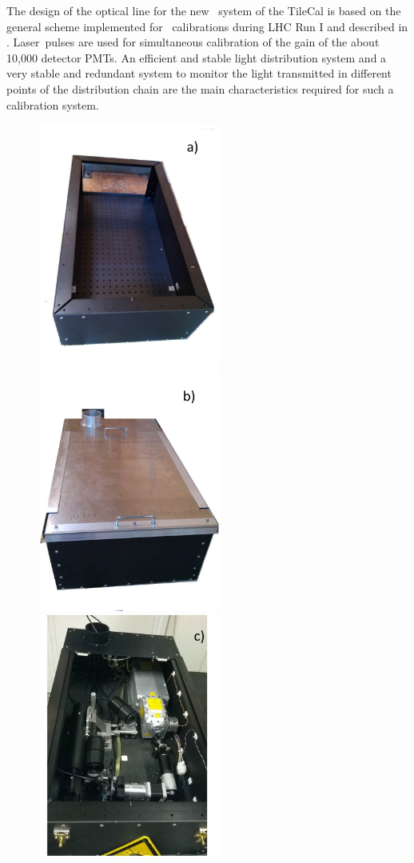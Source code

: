 The design of the optical line for the new \lasii~system of the TileCal is based on the general scheme implemented for \laser~calibrations
during LHC Run I and described in \cite{ref:lasercalvet}. Laser~pulses are used for
simultaneous calibration of the gain of the about 10,000 detector PMTs.
An efficient and stable light distribution system and a very stable and redundant
system to monitor the light transmitted in different points of the distribution
chain are the main characteristics required for such a calibration system.

% 
\begin{figure}[htbp]
\begin{center} 
\includegraphics[width=5.cm, height=8cm]{figures/Optics_box_1}
\includegraphics[width=5.cm, height=8cm]{figures/Optics_box_2}
\includegraphics[width=5.cm, height=8cm]{figures/Optics_box_3}

\end{center}
\end{figure}
